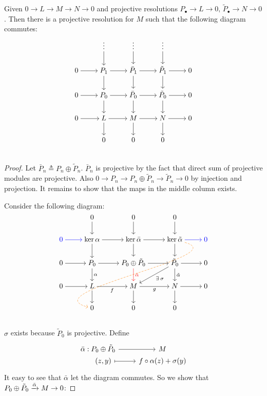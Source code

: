 \begin{theorem} \label{thm:horseshoe-lemma}
  Given $0 \to L \to M \to N \to 0$ and projective resolutions
  $P_\bullet \to L \to 0, \, \tilde P_\bullet \to N \to 0$.
  Then there is a projective resolution for $M$ such that
  the following diagram commutes:
  \[ \begin{tikzcd}[cramped]
      & \vdots \ar[d] & \vdots \ar[d] & \vdots \ar[d] & \\
      0 \ar[r] & P_1 \ar[r] \ar[d] & \bar P_1 \ar[r] \ar[d] & \tilde P_1 \ar[r] \ar[d] & 0 \\
      0 \ar[r] & P_0 \ar[r] \ar[d] & \bar P_0 \ar[r] \ar[d] & \tilde P_0 \ar[r] \ar[d] & 0 \\
      0 \ar[r] & L   \ar[r] \ar[d] & M        \ar[r] \ar[d] & N          \ar[r] \ar[d] & 0 \\
               & 0 & 0 & 0 & \\
  \end{tikzcd} \]

  \begin{proof}
    Let $\bar P_n \triangleq P_n \oplus \tilde P_n$. $\bar P_n$ is projective
    by the fact that direct sum of projective modules are projective. Also
    $0 \to P_n \to P_n \oplus \tilde P_n \to \tilde P_n \to 0$ by
    injection and projection. It remains to show that the
    maps in the middle column exists.

    Consider the following diagram:
    \[ \begin{tikzcd}[cramped]
        & 0 \ar[d] & 0 \ar[d] & 0 \ar[d] & \\
        {\color{blue} 0} \ar[r, blue] &
        \ker \alpha \ar[r] \ar[d] &
        \ker \bar \alpha \ar[r] \ar[d] &
        \ker \tilde \alpha \ar[r, blue] \ar[d] \ar[dddll, dashed, orange, controls={+(3,-0.8) and +(-3,0.8)}]
        & {\color{blue} 0} \\
        0 \ar[r] &
        P_0 \ar[r] \ar[d, "\alpha"] &
        P_0 \oplus \tilde P_0 \ar[r] \ar[d, red, "\bar \alpha" red] &
        \tilde P_0 \ar[r] \ar[d, "\tilde \alpha"] \ar[ld, "\exists \sigma"] & 0 \\
        0 \ar[r] & L \ar[r, "f"'] \ar[d] &
        M \ar[r, "g"'] \ar[d] &
        N \ar[r] \ar[d] & 0 \\
        & 0 & 0 & 0 & \\
    \end{tikzcd} \]
    $\sigma$ exists because $\tilde P_0$ is projective.
    Define
    \[ \begin{tikzcd}[row sep=0pt]
        \bar\alpha : &[-3em] P_0 \oplus \tilde P_0 \ar[r] & M \\
                     &[-3em] (z, y) \ar[r, mapsto] & f \circ \alpha(z) + \sigma(y)
    \end{tikzcd} \]
    It easy to see that $\bar \alpha$ let the diagram commutes.
    So we show that $P_0 \oplus \tilde P_0 \xrightarrow{\bar \alpha} M \to 0$:


\end{proof}
\end{theorem}
